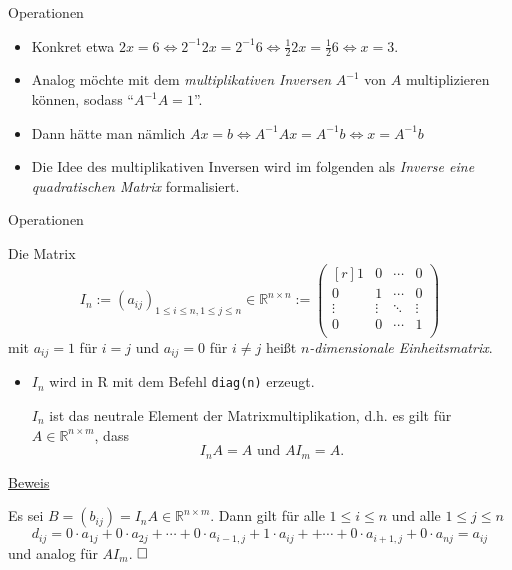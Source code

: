 \documentclass[
  8pt,
  ignorenonframetext,
]{beamer}
\providecommand{\tightlist}{%
  \setlength{\itemsep}{0pt}\setlength{\parskip}{0pt}}
\begin{document}
\begin{frame}{Operationen}
\begin{itemize}
\item
  Konkret etwa
  \(2x = 6 \Leftrightarrow 2^{-1} 2x = 2^{-1}6 \Leftrightarrow \frac{1}{2}2x = \frac{1}{2}6 \Leftrightarrow x = 3\).
\item
  Analog möchte mit dem \emph{multiplikativen Inversen} \(A^{-1}\) von
  \(A\) multiplizieren können, sodass ``\(A^{-1}A = 1\)''.
\item
  Dann hätte man nämlich
  \(Ax = b \Leftrightarrow A^{-1}Ax = A^{-1}b \Leftrightarrow x = A^{-1}b\)
\item
  Die Idee des multiplikativen Inversen wird im folgenden als
  \emph{Inverse eine quadratischen Matrix} formalisiert.
\end{itemize}
\end{frame}

\begin{frame}[fragile]{Operationen}
\protect\hypertarget{operationen-22}{}
\footnotesize
{}
\begin{definition}[Einheitsmatrix]
Die Matrix
\begin{equation}
I_n
:= (a_{ij})_{1\le i \le n, 1 \le j \le n}  \in \mathbb{R}^{n \times n}
:=
\begin{pmatrix*}[r]
1      & 0      & \cdots & 0       \\
0      & 1      & \cdots & 0       \\
\vdots & \vdots & \ddots & \vdots  \\
0      & 0      & \cdots & 1       \\
\end{pmatrix*}
\end{equation}
mit $a_{ij} = 1$ für $i = j$  und  $a_{ij} = 0$ für  $i \neq j$ heißt
\textit{$n$-dimensionale Einheitsmatrix}.
\end{definition}

\begin{itemize}
\tightlist
\item
  \(I_n\) wird in R mit dem Befehl \texttt{diag(n)} erzeugt.

  \begin{theorem}
  \justifying
  \normalfont
  $I_n$ ist das neutrale Element der Matrixmultiplikation, d.h. es gilt für $A \in \mathbb{R}^{n \times m}$,
  dass
  \begin{equation}
  I_nA = A \mbox{ und } AI_m = A.
  \end{equation}
  \end{theorem}
\end{itemize}

\underline{Beweis}

Es sei \(B = (b_{ij}) = I_nA \in \mathbb{R}^{n\times m}\). Dann gilt für
alle \(1 \le i \le n\) und alle \(1 \le j \le n\) \begin{equation}
d_{ij}
= 0 \cdot a_{1j}
+ 0 \cdot a_{2j}
+ \cdots
+ 0 \cdot a_{i-1,j}
+ 1 \cdot a_{ij} +
+ \cdots
+ 0 \cdot a_{i+1,j}
+ 0 \cdot a_{nj}
= a_{ij}
\end{equation} und analog für \(AI_m\). \(\hfill \Box\)
\end{frame}
\end{document}
